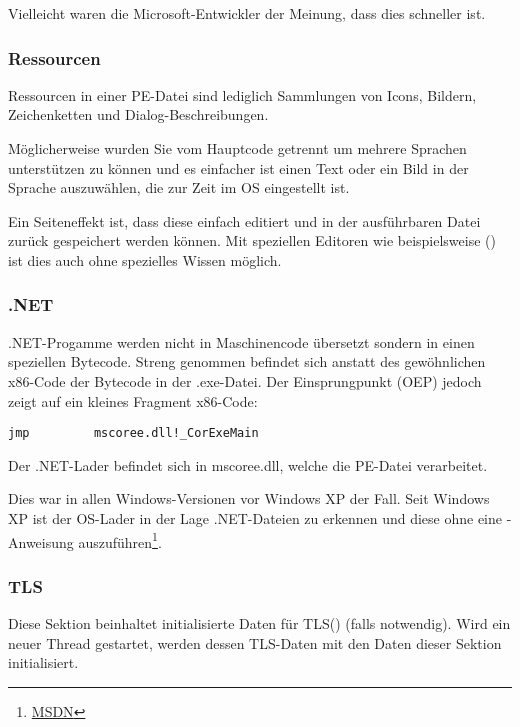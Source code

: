 Vielleicht waren die Microsoft-Entwickler der Meinung, dass dies schneller ist.

\subsubsection{Ressourcen}

\label{PEresources}

Ressourcen in einer PE-Datei sind lediglich Sammlungen von Icons, Bildern,
Zeichenketten und Dialog-Beschreibungen.

Möglicherweise wurden Sie vom Hauptcode getrennt um mehrere Sprachen unterstützen
zu können und es einfacher ist einen Text oder ein Bild in der Sprache auszuwählen,
die zur Zeit im \ac{OS} eingestellt ist.

Ein Seiteneffekt ist, dass diese einfach editiert und in der ausführbaren Datei
zurück gespeichert werden können. Mit speziellen Editoren wie beispielsweise
() ist dies auch ohne spezielles Wissen möglich.

\subsubsection{.NET}


.NET-Progamme werden nicht in Maschinencode übersetzt sondern in einen speziellen Bytecode.
Streng genommen befindet sich anstatt des gewöhnlichen x86-Code der Bytecode in
der .exe-Datei. Der Einsprungpunkt (\ac{OEP}) jedoch zeigt auf ein kleines Fragment
x86-Code:

\begin{lstlisting}
jmp         mscoree.dll!_CorExeMain
\end{lstlisting}

Der .NET-Lader befindet sich in mscoree.dll, welche die PE-Datei verarbeitet.

Dies war in allen Windows-Versionen vor Windows XP der Fall. Seit Windows XP
ist der \ac{OS}-Lader in der Lage .NET-Dateien zu erkennen und diese ohne eine
\JMP-Anweisung auszuführen\footnote{\href{http://msdn.microsoft.com/en-us/library/xh0859k0(v=vs.110).aspx}{MSDN}}.

\subsubsection{TLS}

Diese Sektion beinhaltet initialisierte Daten für \ac{TLS}() (falls notwendig).
Wird ein neuer Thread gestartet, werden dessen \ac{TLS}-Daten mit den Daten dieser
Sektion initialisiert.

